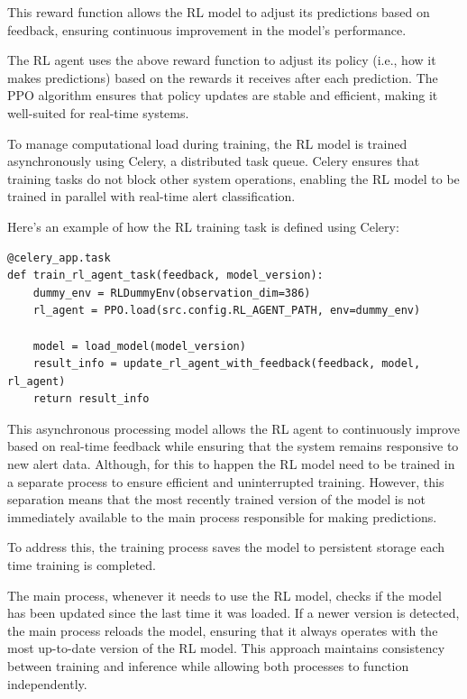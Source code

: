 This reward function allows the RL model to adjust its predictions based on feedback, ensuring continuous improvement in the model's performance.

The RL agent uses the above reward function to adjust its policy (i.e., how it makes predictions) based on the rewards it receives after each prediction. 
The PPO algorithm ensures that policy updates are stable and efficient, making it well-suited for real-time systems.

To manage computational load during training, the RL model is trained asynchronously using Celery, a distributed task queue. 
Celery ensures that training tasks do not block other system operations, enabling the RL model to be trained in parallel with real-time alert classification.

Here's an example of how the RL training task is defined using Celery:

\vspace{0.2cm}
\noindent
\begin{minipage}{\linewidth}
\begin{verbatim}
@celery_app.task
def train_rl_agent_task(feedback, model_version):
    dummy_env = RLDummyEnv(observation_dim=386)
    rl_agent = PPO.load(src.config.RL_AGENT_PATH, env=dummy_env)

    model = load_model(model_version)
    result_info = update_rl_agent_with_feedback(feedback, model, rl_agent)
    return result_info
\end{verbatim}
\label{lst:rl_training_task}
\end{minipage}
\vspace{0.1cm}

This asynchronous processing model allows the RL agent to continuously improve based on real-time feedback while ensuring that the system remains responsive to new alert data.
Although, for this to happen the RL model need to be trained in a separate process to ensure efficient and uninterrupted training. 
However, this separation means that the most recently trained version of the model is not immediately available to the main process responsible for making predictions. 

To address this, the training process saves the model to persistent storage each time training is completed. 

The main process, whenever it needs to use the RL model, checks if the model has been updated since the last time it was loaded. 
If a newer version is detected, the main process reloads the model, ensuring that it always operates with the most up-to-date version of the RL model.
This approach maintains consistency between training and inference while allowing both processes to function independently.

